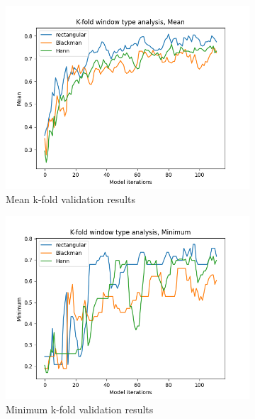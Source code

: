 \documentclass[class=report,11pt,crop=false]{standalone}
\begin{document}
\begin{figure}[ht]
    \begin{subfigure}[b]{0.5\textwidth}
        \includegraphics[width=\linewidth]{Images/kfoldMean.png}
        \caption{Mean k-fold validation results}
        \label{fig:KMean}
    \end{subfigure}
    \hfill
    \begin{subfigure}[b]{0.5\textwidth}
        \includegraphics[width=\linewidth]{Images/kfoldMinimum.png}
        \caption{Minimum k-fold validation results}
        \label{fig:KMin}
    \end{subfigure}
    \hfill
    \begin{subfigure}[b]{0.5\textwidth}

\end{subfigure}
\end{figure}
\end{document}
